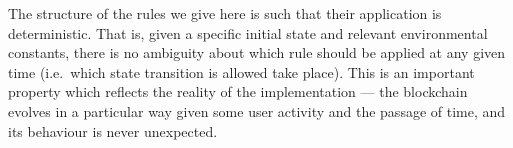 The structure of the rules we give here is such that their application is
deterministic. That is, given a specific initial state and relevant environmental
constants, there is no ambiguity
about which rule should be applied at any given time (i.e.~which state
transition is allowed take place). This is an important property which reflects
the reality of the implementation --- the blockchain evolves in a particular way
given some user activity and the passage of time, and its behaviour is
never unexpected.
